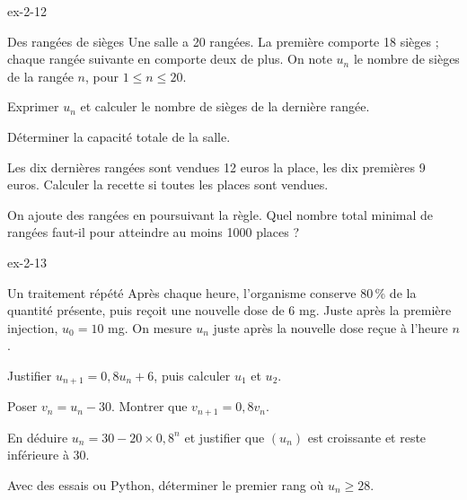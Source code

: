 \clearpage
{}
\begin{blocLivre}{ex-2-12}
\begin{exercice}[3]{Des rangées de sièges}
Une salle a 20 rangées. La première comporte 18 sièges ; chaque rangée suivante
en comporte deux de plus. On note $u_n$ le nombre de sièges de la rangée $n$, pour $1\leq n\leq20$.
\begin{questions}
\item Exprimer $u_n$ et calculer le nombre de sièges de la dernière rangée.
\item Déterminer la capacité totale de la salle.
\item Les dix dernières rangées sont vendues 12 euros la place, les dix premières 9 euros.
Calculer la recette si toutes les places sont vendues.
\item On ajoute des rangées en poursuivant la règle. Quel nombre total minimal de rangées
faut-il pour atteindre au moins 1000 places ?
\end{questions}
\end{exercice}
\end{blocLivre}
\begin{blocLivre}{ex-2-13}
\begin{exercice}[3]{Un traitement répété}
Après chaque heure, l'organisme conserve 80\,\% de la quantité présente, puis
reçoit une nouvelle dose de 6 mg. Juste après la première injection, $u_0=10$ mg.
On mesure $u_n$ juste après la nouvelle dose reçue à l'heure $n$.
\begin{questions}
\item Justifier $u_{n+1}=0{,}8u_n+6$, puis calculer $u_1$ et $u_2$.
\item Poser $v_n=u_n-30$. Montrer que $v_{n+1}=0{,}8v_n$.
\item En déduire $u_n=30-20\times0{,}8^n$ et justifier que $(u_n)$ est croissante et reste inférieure à 30.
\item Avec des essais ou Python, déterminer le premier rang où $u_n\geq28$.
\end{questions}
\label{figlivre-r02-13-cycle-ex}

\end{exercice}
\end{blocLivre}
